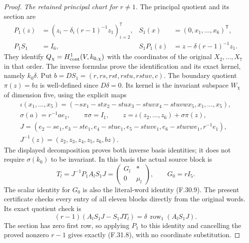 \begin{proof}
\emph{The retained principal chart for $r\ne1$.}
The principal quotient and its section are
\[
 \begin{aligned}
 P_1(z)&=(z_i-\delta_i(r-1)^{-1}z_1)_{i=2}^7,
 &S_1(x)&=(0,x_1,\ldots,x_6)^{\mathsf T},\\
 P_1S_1&=I_6,
 &S_1P_1(z)&=z-\delta(r-1)^{-1}z_1.
 \end{aligned}                                                \tag{F.31.6}
\]
They identify
$Q_\chi=H^1_{\rm cont}(V,k_{0,\chi})$
with the coordinates of the original
$X_2,\ldots,X_7$ in that order.
The inverse formulas prove the identification
and its exact kernel, namely $k_0\delta$.
Put $b=DS_1=(r,rs,rst,rstu,rstuv,c)$.
The boundary quotient $\pi(z)=bz$ is
well-defined since $D\delta=0$.
Its kernel is the invariant subspace $W_\chi$
of dimension five, using the explicit maps
\[
 \begin{gathered}
 \iota(x_1,\ldots,x_5)=
 (-sx_1-stx_2-stux_3-stuvx_4-stuvwx_5,x_1,\ldots,x_5),\\
 \sigma(a)=r^{-1}ae_1,\qquad
 \pi\sigma=I_1,\qquad
 z=\iota(z_2,\ldots,z_6)+\sigma\pi(z),\\
 J=(e_2-se_1,e_3-ste_1,e_4-stue_1,
              e_5-stuve_1,e_6-stuvwe_1,r^{-1}e_1),\\
 J^{-1}(z)=(z_2,z_3,z_4,z_5,z_6,bz).
 \end{gathered}                                                \tag{F.31.7}
\]
The displayed decomposition proves both
inverse basis identities; it does not
require $\sigma(k_0)$ to be invariant.
In this basis the actual source block is
\[
 T_l=J^{-1}P_1A_lS_1J=
       \begin{pmatrix}G_l&*\\0&\mu_l\end{pmatrix},
                    \qquad G_0=rI_5.
                                                               \tag{F.31.8}
\]
The scalar identity for $G_0$ is also the
literal-word identity (F.30.9).
The present certificate checks every entry
of all eleven blocks directly from the
original words. Its exact quotient check is
\[
 (r-1)(A_lS_1J-S_1JT_l)
       =\delta\,\operatorname{row}_1(A_lS_1J).
                                                               \tag{F.31.9}
\]
The section has zero first row, so applying
$P_1$ to this identity and cancelling
the proved nonzero $r-1$ gives exactly
(F.31.8), with no coordinate substitution.


\end{proof}

